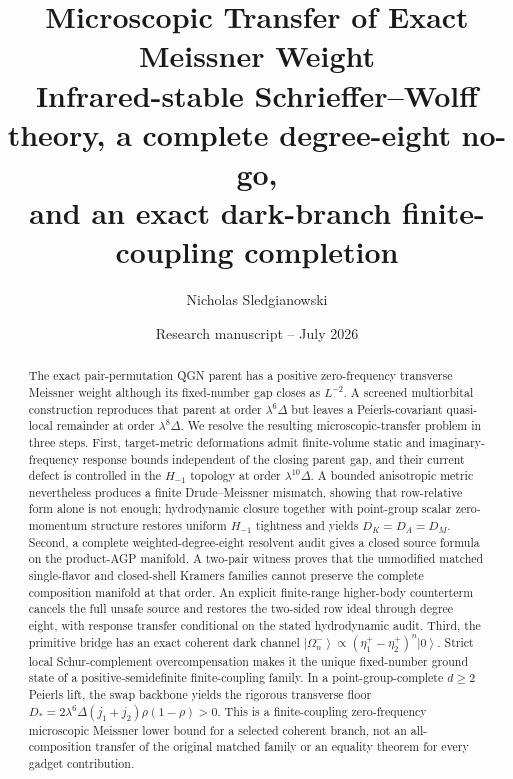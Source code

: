 \documentclass[11pt]{article}
\title{\textbf{Microscopic Transfer of Exact Meissner Weight}\\[0.35em]
\large Infrared-stable Schrieffer--Wolff theory, a complete degree-eight no-go,\\
and an exact dark-branch finite-coupling completion}
\author{Nicholas Sledgianowski}
\date{Research manuscript -- July 2026}
\theoremstyle{definition}
\theoremstyle{remark}
\newcommand{\ket}[1]{\left|#1\right\rangle}
\begin{document}
\maketitle

\begin{abstract}
The exact pair-permutation QGN parent has a positive zero-frequency transverse
Meissner weight although its fixed-number gap closes as $L^{-2}$.  A screened
multiorbital construction reproduces that parent at order $\lambda^6\Delta$
but leaves a Peierls-covariant quasi-local remainder at order
$\lambda^8\Delta$.  We resolve the resulting microscopic-transfer problem in
three steps.  First, target-metric deformations admit finite-volume static and
imaginary-frequency response bounds independent of the closing parent gap, and
their current defect is controlled in the $H_{-1}$ topology at order
$\lambda^{10}\Delta$.  A bounded anisotropic metric nevertheless produces a
finite Drude--Meissner mismatch, showing that row-relative form alone is not
enough; hydrodynamic closure together with point-group scalar zero-momentum
structure restores uniform $H_{-1}$ tightness and yields $D_K=D_A=D_M$.
Second, a complete weighted-degree-eight resolvent audit gives a closed source
formula on the product-AGP manifold.  A two-pair witness proves that the
unmodified matched single-flavor and closed-shell Kramers families cannot
preserve the complete composition manifold at that order.  An explicit
finite-range higher-body counterterm cancels the full unsafe source and restores
the two-sided row ideal through degree eight, with response transfer conditional
on the stated hydrodynamic audit.  Third, the primitive bridge has an exact
coherent dark channel
$\ket{\Omega_n^-}\propto(\eta_1^+-\eta_2^+)^n\ket0$.  Strict local
Schur-complement overcompensation makes it the unique fixed-number ground state
of a positive-semidefinite finite-coupling family.  In a point-group-complete
$d\ge2$ Peierls lift, the swap backbone yields the rigorous transverse floor
$D_*=2\lambda^6\Delta(j_1+j_2)\rho(1-\rho)>0$.  This is a finite-coupling
zero-frequency microscopic Meissner lower bound for a selected coherent branch,
not an all-composition transfer of the original matched family or an equality
theorem for every gadget contribution.
\end{abstract}
\end{document}
